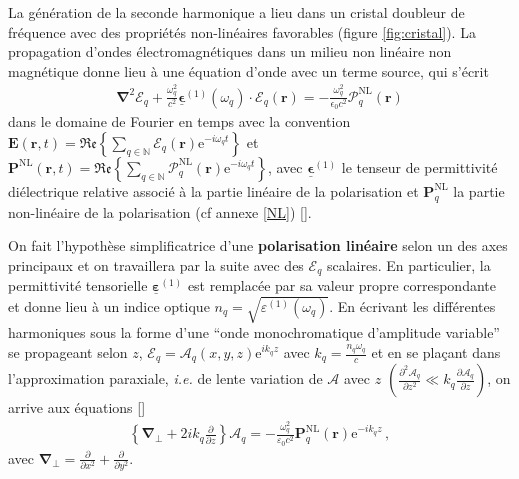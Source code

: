 \documentclass[11pt,a4paper]{article}
\newcommand{\ncite}[1]{[\citenum{#1}]}
\newcommand{\pdv}[2]{\frac{\partial #1}{\partial #2}}
\newcommand{\E}{\mathcal{E}}
\newcommand{\A}{\mathcal{A}}
\newcommand{\e}[1]{\text{e}^{#1}}
\newcommand{\mathsc}[1]{\mathrm{\scriptscriptstyle {#1}}}
\renewcommand{\v}[1]{\boldsymbol{\mathbf{#1}}}
\newcommand{\tens}[1]{\boldsymbol{\underline{#1}}}
\begin{document}
La génération de la seconde harmonique a lieu dans un cristal doubleur de fréquence avec des propriétés non-linéaires favorables (figure \ref{fig:cristal}).
La propagation d'ondes électromagnétiques dans un milieu non linéaire non magnétique donne lieu à une équation d'onde avec un terme source, qui s'écrit 
\begin{align}
\boldsymbol{\nabla}^2 \boldsymbol{\E}_q + \frac{\omega_q^2}{c^2}\tens\epsilon^{(1)}(\omega_q)\cdot \v \E_q(\v r) = - \frac{\omega_q^2}{\epsilon_0 c^2} \boldsymbol{\mathcal{P}}^\mathsc{NL}_q(\v r)
\end{align}
dans le domaine de Fourier en temps avec la convention $\v E(\v r, t) = \mathfrak{Re} \left\{ \sum_{q \in \mathbb N} \v {\boldsymbol{\mathcal E}}_q (\v r) \e{-i \omega_q t} \right\}$ et $\v P^\mathsc{NL} (\v r, t) = \mathfrak{Re} \left\{ \sum_{q \in \mathbb N} \v {\boldsymbol{\mathcal P}}^\mathsc{NL}_q (\v r) \e{-i \omega_q t} \right\}
$,
avec $\tens \epsilon^{(1)}$ le tenseur de permittivité diélectrique relative associé à la partie linéaire de la polarisation et $\v P^\mathsc{NL}_q$ la partie non-linéaire de la polarisation (cf annexe \ref{NL}) \ncite{boyd,joffre}.

On fait l'hypothèse simplificatrice d'une \textbf{polarisation linéaire} selon un des axes principaux et on travaillera par la suite avec des $\mathcal E_q$ scalaires. En particulier, la permittivité tensorielle $\tens \varepsilon^{(1)}$ est remplacée par sa valeur propre correspondante et donne lieu à un indice optique $\boxed{ n_q = \sqrt{ \varepsilon^{(1)}(\omega_q)}}$. En écrivant les différentes harmoniques sous la forme d'une ``onde monochromatique d'amplitude variable'' se propageant selon $z$, $\mathcal E_q = \A_q(x,y,z) \e{ik_qz}$ avec $\boxed{k_q =\frac{n_q \omega_q}{c}}$ et en se plaçant dans l'approximation paraxiale, \textit{i.e.} de lente variation de $\A$ avec $z$ $\left(\frac{\partial^2 \A_q}{\partial z^2} \ll k_q \frac{\partial \A_q}{\partial z}\right)$, on arrive aux équations \ncite{joffre}
\begin{align}  
	\left\{\v\nabla_\bot + 2 i k_q \frac{\partial}{\partial z} \right\} \A_q = - \frac{\omega_q^2}{\varepsilon_0 c^2} \v P^\mathsc{NL}_q (\v r) \e{-ik_qz} \,,
	\label{eq:parax}
\end{align}
avec $\v\nabla_\bot = \pdv{}{x^2} + \pdv{}{y^2}$.
\end{document}
